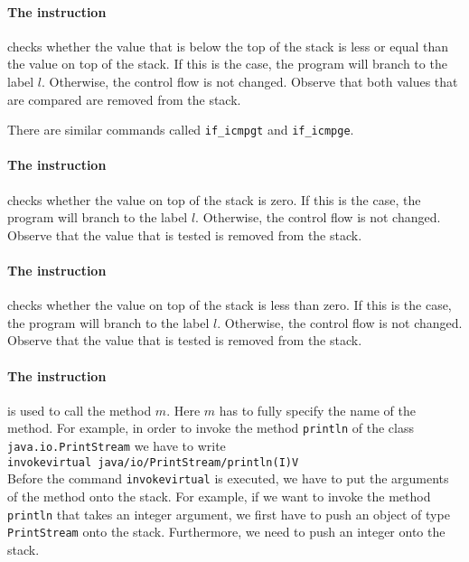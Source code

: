 \paragraph{The instruction }
checks whether the value that is below the top of the stack is less or equal than the value on top
of the stack.  If this is the case, the program will branch 
to the label $l$.  Otherwise, the control flow is not changed.  Observe that both values that are
compared are removed from the stack.

There are similar commands called \texttt{if\_icmpgt} and \texttt{if\_icmpge}.

\paragraph{The instruction }
checks whether the value on top of the stack is zero.  If this is the case, the program will branch
to the label $l$.  Otherwise, the control flow is not changed.  Observe that the value that is
tested is removed from the stack.


\paragraph{The instruction }
checks whether the value on top of the stack is less than zero.  If this is the case, the program
will branch to the label $l$.  Otherwise, the control flow is not changed.  Observe that the value
that is tested is removed from the stack.


\paragraph{The instruction }
is used to call the method $m$.  Here $m$ has to fully specify the name of the method.
For example, in order to invoke the method \texttt{println} of the class
\texttt{java.io.PrintStream} we have to write 
\\[0.2cm]
\hspace*{1.3cm}
\texttt{invokevirtual java/io/PrintStream/println(I)V}
\\[0.2cm]
Before the command \texttt{invokevirtual} is executed, we have to put the arguments of the method
onto the stack.  For example, if we want to invoke the method \texttt{println} that takes an integer
argument, we first have to push an object of type \texttt{PrintStream} onto the stack.  Furthermore,
we need to push an integer onto the stack.

